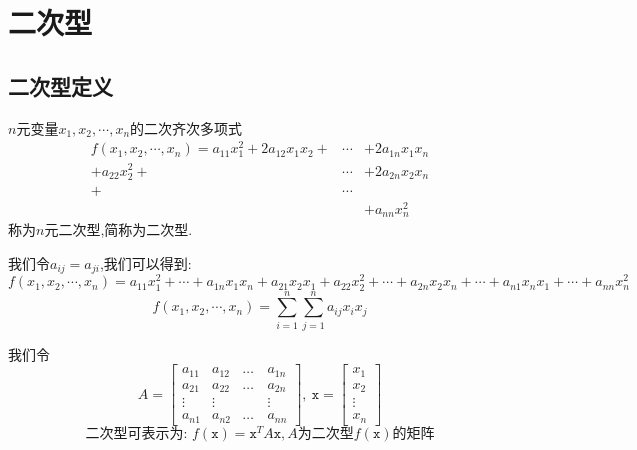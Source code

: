 \chapter{二次型}
\section{二次型定义}
\begin{definition}[二次型]
	$n$元变量$x_{1},x_{2},\cdots,x_{n}$的二次齐次多项式
	\begin{eqnarray*}
		f(x_{1},x_{2},\cdots,x_{n})=a_{11}x_{1}^{2}+2a_{12}x_{1}x_{2}+&\cdots&+2a_{1n}x_{1}x_{n}\\
		+a_{22}x_{2}^2+&\cdots&+2a_{2n}x_{2}x_{n}\\
		+&\cdots&\quad \\
		& &+a_{nn}x_{n}^{2}
	\end{eqnarray*}
	称为$n$元二次型,简称为二次型.
	
	我们令$a_{ij}=a_{ji}$,我们可以得到:  
	$$f(x_{1},x_{2},\cdots,x_{n})=a_{11}x_{1}^{2}+\cdots+a_{1n}x_{1}x_{n}+a_{21}x_{2}x_{1}+a_{22}x_{2}^2+\cdots+a_{2n}x_{2}x_{n}
	+\cdots+a_{n1}x_{n}x_{1}+\cdots+a_{nn}x_{n}^{2}$$
	$$f(x_{1},x_{2},\cdots,x_{n})=\sum\limits_{i=1}^{n}\sum\limits_{j=1}^{n}a_{ij}x_{i}x_{j}$$
	
	我们令$$A=\left[\begin{matrix}
		a_{11}&a_{12}&\dots&a_{1n}\\
		a_{21}&a_{22}&\dots&a_{2n}\\
		\vdots&\vdots&\quad&\vdots\\
		a_{n1}&a_{n2}&\dots&a_{nn}
	\end{matrix} \right],\ \mathtt{x}=\left[\begin{matrix}
	x_{1}\\x_{2}\\\vdots\\x_{n}
	\end{matrix} \right]$$
	$$\text{二次型可表示为:  }f(\mathtt{x})=\mathtt{x}^{T}A\mathtt{x},A\text{为二次型}f(\mathtt{x})\text{的矩阵}$$
\end{definition}
